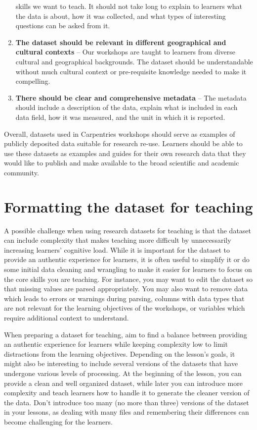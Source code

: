 \documentclass[
]{book}
\begin{document}
\begin{enumerate}
  skills we want to teach. It should not take long to explain to learners what the data is about,
  how it was collected, and what types of interesting questions can be asked from it.
\item
  \textbf{The dataset should be relevant in different geographical and cultural contexts} -- Our
  workshops are taught to learners from diverse cultural and geographical backgrounds. The
  dataset should be
  understandable without much cultural context or pre-requisite knowledge needed
  to make it compelling.
\item
  \textbf{There should be clear and comprehensive metadata} -- The metadata should include a
  description of the data, explain what is included in each data field, how it was measured,
  and the unit in which it is reported.
\end{enumerate}

Overall, datasets used in Carpentries workshops should serve as examples of publicly
deposited
data suitable for research re-use. Learners should be able to use these datasets as examples
and guides for their own research data that they would like to publish and make available to
the broad scientific and academic community.

\hypertarget{formatting-the-dataset-for-teaching}{%
\section{Formatting the dataset for teaching}\label{formatting-the-dataset-for-teaching}}

A possible challenge when using research datasets for teaching is that the dataset can
include complexity that makes teaching more difficult by unnecessarily increasing
learners' cognitive load. While it is important for the dataset to
provide an authentic experience for learners, it is often useful to simplify it or
do some initial data cleaning and wrangling to make it easier for learners
to focus on the core skills you are teaching. For instance, you
may want to edit the dataset so that missing values are parsed appropriately.
You may also want to remove data which leads to errors or warnings during parsing,
columns with data types
that are not relevant for the learning objectives of the workshops, or variables which
require additional context to understand.

When preparing a dataset for teaching, aim to find a balance between providing an
authentic experience for learners while keeping complexity low to limit distractions from the
learning objectives. Depending on the lesson's goals, it might also be interesting to
include several versions of the datasets that have undergone various levels of processing.
At the beginning of the lesson, you can provide a clean and well organized dataset, while
later you can introduce more complexity and teach learners how to handle it to generate the cleaner
version of the data. Don't introduce too many (no more than three) versions of the dataset in
your lessons, as dealing with many files and remembering their differences can become
challenging for the learners.
\end{document}
